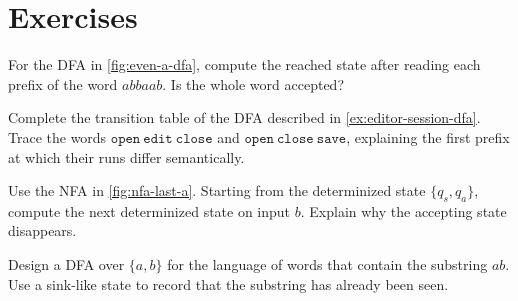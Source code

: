 \section*{Exercises}

\begin{chapex}
For the DFA in \cref{fig:even-a-dfa}, compute the reached state after
reading each prefix of the word $abbaab$.  Is the whole word accepted?
\end{chapex}

\begin{chapex}
Complete the transition table of the DFA described in
\cref{ex:editor-session-dfa}.  Trace the words
\(\texttt{open}\ \texttt{edit}\ \texttt{close}\) and
\(\texttt{open}\ \texttt{close}\ \texttt{save}\), explaining the first
prefix at which their runs differ semantically.
\end{chapex}

\begin{chapex}
Use the NFA in \cref{fig:nfa-last-a}.  Starting from the determinized
state $\{q_s,q_a\}$, compute the next determinized state on input $b$.
Explain why the accepting state disappears.
\end{chapex}

\begin{chapex}[Design]
Design a DFA over $\{a,b\}$ for the language of words that contain the
substring $ab$.  Use a sink-like state to record that the substring has
already been seen.
\end{chapex}
